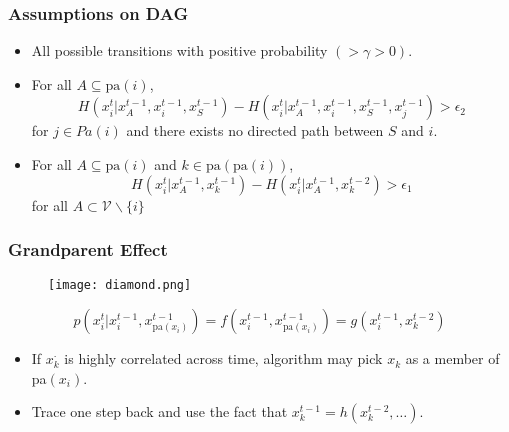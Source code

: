 \documentclass{beamer}
\begin{document}
\begin{frame}
\frametitle{Assumptions on DAG}
\begin{itemize}
\item All possible transitions with positive probability $(> \gamma > 0)$.
\item For all $A \subseteq \text{pa}(i)$, $$H(x^t_i|x^{t-1}_A, x^{t-1}_i, x^{t-1}_S) - H(x^t_i|x^{t-1}_A, x^{t-1}_i, x^{t-1}_S, x^{t-1}_j) > \epsilon_2$$ for $j \in Pa(i)$ and there exists no directed path between $S$ and $i$.
\item For all $A \subseteq \text{pa}(i)$ and $k \in \text{pa}(\text{pa}(i))$, $$ H(x^t_i|x^{t-1}_A, x^{t-1}_k) - H(x^t_i|x^{t-1}_A, x^{t-2}_k) > \epsilon_1 $$ for all $A \subset \mathcal{V} \backslash \{i\}$
\end{itemize}
\end{frame}

\begin{frame}
\frametitle{Grandparent Effect}
\footnotesize
\begin{figure}
	\centering
		\texttt{[image: diamond.png]}
\end{figure}
$$p\left(x^{t}_{i}|x^{t-1}_{i}, x^{t-1}_{\text{pa}(x_i)}\right) = f(x^{t-1}_{i}, x^{t-1}_{\text{pa}(x_i)}) = g(x^{t-1}_{i}, x^{t-2}_k)$$
\begin{itemize}
\item If $x^{\cdot}_k$ is highly correlated across time, algorithm may pick $x_k$ as a member of pa$(x_i)$.
\item Trace one step back and use the fact that $x^{t-1}_k = h(x_k^{t-2},\ldots)$.
\end{itemize}
\end{frame}
\end{document}

